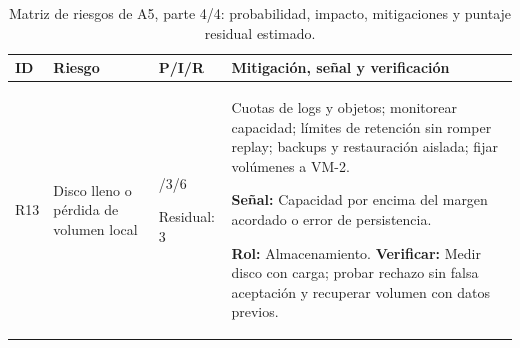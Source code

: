 \clearpage
\begin{table}[H]
\centering\small
\setlength{\tabcolsep}{4pt}
\renewcommand{\arraystretch}{1.10}
\caption{Matriz de riesgos de A5, parte 4/4: probabilidad, impacto, mitigaciones y puntaje residual estimado.}\label{tab:a5-riesgos-4}
\begin{tabularx}{\textwidth}{>{\raggedright\arraybackslash}p{0.75cm} >{\raggedright\arraybackslash}p{2.8cm} >{\raggedright\arraybackslash}p{1.8cm} >{\raggedright\arraybackslash}X}
\toprule
\textbf{ID} & \textbf{Riesgo} & \textbf{P/I/R} & \textbf{Mitigación, señal y verificación} \\
\midrule
R13 & Disco lleno o pérdida de volumen local & 2/3/6\par Residual: 3 & Cuotas de logs y objetos; monitorear capacidad; límites de retención sin romper replay; backups y restauración aislada; fijar volúmenes a VM-2.\par\textbf{Señal:} Capacidad por encima del margen acordado o error de persistencia.\par\textbf{Rol:} Almacenamiento. \textbf{Verificar:} Medir disco con carga; probar rechazo sin falsa aceptación y recuperar volumen con datos previos. \\[4pt]
\bottomrule
\end{tabularx}
\end{table}
